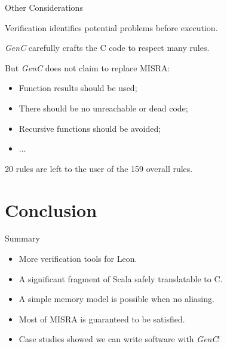 \documentclass[xcolor={usenames,dvipsnames}]{beamer}
\newcommand{\GenC}{\emph{GenC}\xspace}
\newcommand{\InlineS}[1]{\texttt|#1|}
\begin{document}
\begin{frame}{Other Considerations}

  Verification identifies potential problems before execution.%

  \GenC carefully crafts the C code to respect many rules.%


  \pause \vfill

  But \GenC does not claim to replace MISRA:
  \begin{itemize}
    \item Function results should be used;
    \item There should be no unreachable or dead code;
    \item Recursive functions should be avoided;
    \item ...
  \end{itemize}

  {\hfill 20 rules are left to the user of the 159 overall rules.}

\end{frame}



\section{Conclusion}

\begin{frame}{Summary}

  \begin{itemize}
    \item More verification tools for Leon.
      \vfill
    \item A significant fragment of Scala \alert{safely} translatable to C.
      \vfill
    \item A simple memory model is possible when no aliasing.
      \vfill
    \item Most of MISRA is guaranteed to be satisfied.
      \vfill
    \item Case studies showed we can write software with \GenC!
  \end{itemize}

\end{frame}
\end{document}
